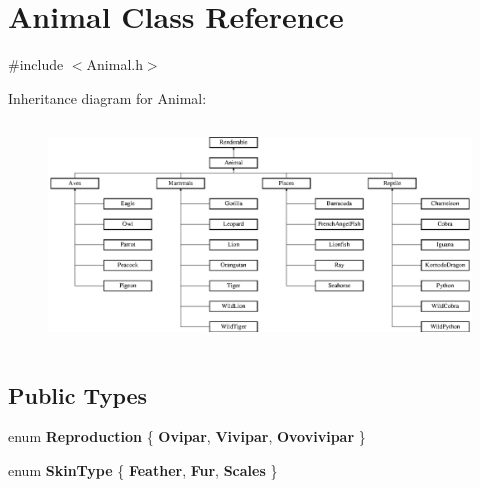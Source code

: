 \hypertarget{classAnimal}{\section{Animal Class Reference}
\label{classAnimal}
}


{\ttfamily \#include $<$Animal.\+h$>$}

Inheritance diagram for Animal\+:\begin{figure}[H]
\begin{center}
\leavevmode
\includegraphics[height=5.932203cm]{classAnimal}
\end{center}
\end{figure}
\subsection*{Public Types}
\begin{DoxyCompactItemize}
\item 
\hypertarget{classAnimal_a5b18980289499046b37cb6973ddd9116}{enum {\bfseries Reproduction} \{ {\bfseries Ovipar}, 
{\bfseries Vivipar}, 
{\bfseries Ovovivipar}
 \}}\label{classAnimal_a5b18980289499046b37cb6973ddd9116}

\item 
\hypertarget{classAnimal_acd95d1fad1f74017e4fc3e1ab6fd2b77}{enum {\bfseries Skin\+Type} \{ {\bfseries Feather}, 
{\bfseries Fur}, 
{\bfseries Scales}
 \}}\label{classAnimal_acd95d1fad1f74017e4fc3e1ab6fd2b77}

\end{DoxyCompactItemize}
